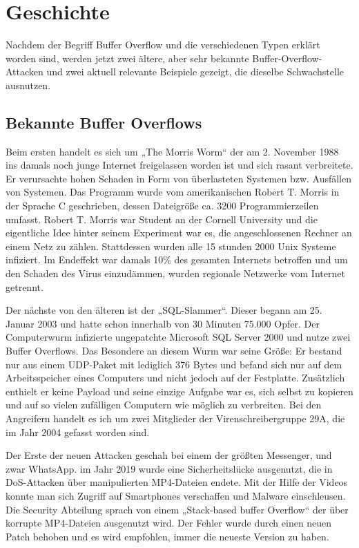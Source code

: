 \section{Geschichte}
Nachdem der Begriff Buffer Overflow und die verschiedenen Typen erklärt worden sind,
werden jetzt zwei ältere, aber sehr bekannte Buffer-Overflow-Attacken und zwei aktuell relevante Beispiele gezeigt,
die dieselbe Schwachstelle ausnutzen.

\subsection{Bekannte Buffer Overflows}

Beim ersten handelt es sich um „The Morris Worm“ der am 2. November 1988 ins damals noch junge Internet freigelassen
worden ist und sich rasant verbreitete. Er verursachte hohen Schaden in Form von überlasteten Systemen bzw. Ausfällen
von Systemen. Das Programm wurde vom amerikanischen Robert T. Morris in der Sprache C geschrieben, dessen Dateigröße
ca. 3200 Programmierzeilen umfasst. Robert T. Morris war Student an der Cornell University und die eigentliche
Idee hinter seinem Experiment war es, die angeschlossenen Rechner an einem Netz zu zählen. Stattdessen wurden alle
15 stunden 2000 Unix Systeme infiziert. Im Endeffekt war damals 10\% des gesamten Internets betroffen und um den
Schaden des Virus einzudämmen, wurden regionale Netzwerke vom Internet getrennt.

Der nächste von den älteren ist der „SQL-Slammer“. Dieser begann am 25. Januar 2003 und hatte schon innerhalb
von 30 Minuten 75.000 Opfer. Der Computerwurm infizierte ungepatchte Microsoft SQL Server 2000 und nutze zwei
Buffer Overflows. Das Besondere an diesem Wurm war seine Größe: Er bestand nur aus einem UDP-Paket mit lediglich
376 Bytes und befand sich nur auf dem Arbeitsspeicher eines Computers und nicht jedoch auf der Festplatte.
Zusätzlich enthielt er keine Payload und seine einzige Aufgabe war es, sich selbst zu kopieren und auf so
vielen zufälligen Computern wie möglich zu verbreiten. Bei den Angreifern handelt es ich um zwei Mitglieder
der Virenschreibergruppe 29A, die im Jahr 2004 gefasst worden sind.

Der Erste der neuen Attacken geschah bei einem der größten Messenger, und zwar WhatsApp. im Jahr
2019 wurde eine Sicherheitslücke ausgenutzt, die in DoS-Attacken über manipulierten MP4-Dateien endete.
Mit der Hilfe der Videos konnte man sich Zugriff auf Smartphones verschaffen und Malware einschleusen.
Die Security Abteilung sprach von einem „Stack-based buffer Overflow“ der über korrupte MP4-Dateien ausgenutzt wird.
Der Fehler wurde durch einen neuen Patch behoben und es wird empfohlen, immer die neueste Version zu haben.

